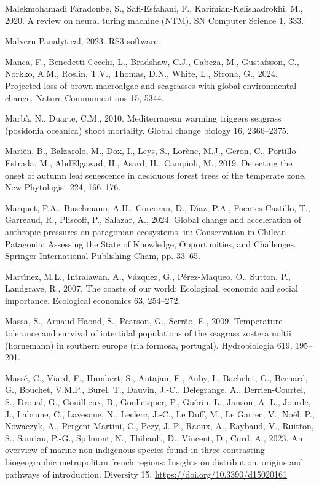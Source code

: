 \documentclass[
  letterpaper,
  11pt,
  english,
  singlespacing,
  headsepline]{MastersDoctoralThesis}
\newlength{\cslhangindent}
\newenvironment{CSLReferences}[2] %
 {\begin{list}{}{%
  \setlength{\itemindent}{0pt}
  \setlength{\leftmargin}{0pt}
  \setlength{\parsep}{0pt}
  \ifodd #1
   \setlength{\leftmargin}{\cslhangindent}
   \setlength{\itemindent}{-1\cslhangindent}
  \fi
  \setlength{\itemsep}{#2\baselineskip}}}
 {\end{list}}
\begin{document}
\begin{CSLReferences}{1}{0}
Malekmohamadi Faradonbe, S., Safi-Esfahani, F., Karimian-Kelishadrokhi,
M., 2020. A review on neural turing machine (NTM). SN Computer Science
1, 333.

Malvern Panalytical, 2023.
\href{https://www.malvernpanalytical.com/en/support/product-support/software/rs3}{RS3
software}.

Manca, F., Benedetti-Cecchi, L., Bradshaw, C.J., Cabeza, M., Gustafsson,
C., Norkko, A.M., Roslin, T.V., Thomas, D.N., White, L., Strona, G.,
2024. Projected loss of brown macroalgae and seagrasses with global
environmental change. Nature Communications 15, 5344.

Marbà, N., Duarte, C.M., 2010. Mediterranean warming triggers seagrass
(posidonia oceanica) shoot mortality. Global change biology 16,
2366--2375.

Mariën, B., Balzarolo, M., Dox, I., Leys, S., Lorène, M.J., Geron, C.,
Portillo-Estrada, M., AbdElgawad, H., Asard, H., Campioli, M., 2019.
Detecting the onset of autumn leaf senescence in deciduous forest trees
of the temperate zone. New Phytologist 224, 166--176.

Marquet, P.A., Buschmann, A.H., Corcoran, D., Dı́az, P.A.,
Fuentes-Castillo, T., Garreaud, R., Pliscoff, P., Salazar, A., 2024.
Global change and acceleration of anthropic pressures on patagonian
ecosystems, in: Conservation in Chilean Patagonia: Assessing the State
of Knowledge, Opportunities, and Challenges. Springer International
Publishing Cham, pp. 33--65.

Martı́nez, M.L., Intralawan, A., Vázquez, G., Pérez-Maqueo, O., Sutton,
P., Landgrave, R., 2007. The coasts of our world: Ecological, economic
and social importance. Ecological economics 63, 254--272.

Massa, S., Arnaud-Haond, S., Pearson, G., Serrão, E., 2009. Temperature
tolerance and survival of intertidal populations of the seagrass zostera
noltii (hornemann) in southern europe (ria formosa, portugal).
Hydrobiologia 619, 195--201.

Massé, C., Viard, F., Humbert, S., Antajan, E., Auby, I., Bachelet, G.,
Bernard, G., Bouchet, V.M.P., Burel, T., Dauvin, J.-C., Delegrange, A.,
Derrien-Courtel, S., Droual, G., Gouillieux, B., Goulletquer, P.,
Guérin, L., Janson, A.-L., Jourde, J., Labrune, C., Lavesque, N.,
Leclerc, J.-C., Le Duff, M., Le Garrec, V., Noël, P., Nowaczyk, A.,
Pergent-Martini, C., Pezy, J.-P., Raoux, A., Raybaud, V., Ruitton, S.,
Sauriau, P.-G., Spilmont, N., Thibault, D., Vincent, D., Curd, A., 2023.
An overview of marine non-indigenous species found in three contrasting
biogeographic metropolitan french regions: Insights on distribution,
origins and pathways of introduction. Diversity 15.
\url{https://doi.org/10.3390/d15020161}


\end{CSLReferences}
\end{document}
